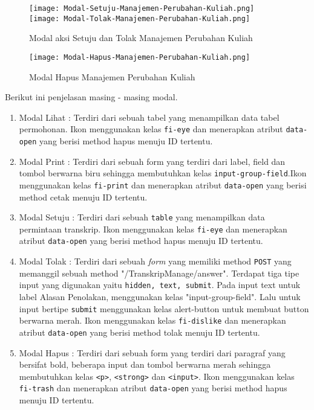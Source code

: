 \begin{figure} [H]
	\centering  
	\texttt{[image: Modal-Setuju-Manajemen-Perubahan-Kuliah.png]}
	\texttt{[image: Modal-Tolak-Manajemen-Perubahan-Kuliah.png]}    
	\caption{Modal aksi Setuju dan Tolak Manajemen Perubahan Kuliah} 
\end{figure}


\begin{figure} [H]
	\centering  
	\texttt{[image: Modal-Hapus-Manajemen-Perubahan-Kuliah.png]}  
	\caption{Modal Hapus Manajemen Perubahan Kuliah} 
\end{figure}

Berikut ini penjelasan masing - masing modal.
\begin{enumerate}
	
	\item Modal Lihat : Terdiri dari sebuah tabel yang menampilkan data tabel permohonan. Ikon menggunakan kelas  \colorbox{mygray}{\texttt{fi-eye}} dan menerapkan atribut  \colorbox{mygray}{\texttt{data-open}} yang berisi method hapus menuju ID tertentu.
	
	\item Modal Print : Terdiri dari sebuah form yang terdiri dari label, field dan tombol berwarna biru sehingga membutuhkan kelas  \colorbox{mygray}{\verb|input-group-field|}.Ikon menggunakan kelas  \colorbox{mygray}{\texttt{fi-print}} dan menerapkan atribut \texttt{data-open} yang berisi method cetak menuju ID tertentu.
	
	\item Modal Setuju : Terdiri dari sebuah \texttt{table} yang menampilkan data permintaan transkrip. Ikon menggunakan kelas  \colorbox{mygray}{\texttt{fi-eye}} dan menerapkan atribut  \colorbox{mygray}{\texttt{data-open}} yang berisi method hapus menuju ID tertentu.
	
	\item Modal Tolak : Terdiri dari sebuah \textit{form} yang memiliki method \texttt{POST} yang memanggil sebuah method "/TranskripManage/answer". Terdapat tiga tipe input yang digunakan yaitu  \colorbox{mygray}{\texttt{hidden, text, submit}}. Pada input text untuk label Alasan Penolakan, menggunakan kelas "input-group-field". Lalu untuk input bertipe  \colorbox{mygray}{\texttt{submit}} menggunakan kelas alert-button untuk membuat button berwarna merah. Ikon menggunakan kelas \texttt{fi-dislike} dan menerapkan atribut  \colorbox{mygray}{\texttt{data-open}} yang berisi method tolak menuju ID tertentu.	
	
	\item Modal Hapus : Terdiri dari sebuah form yang terdiri dari paragraf yang bersifat bold, beberapa input dan tombol berwarna merah sehingga membutuhkan kelas \colorbox{mygray}{\texttt{<p>}}, \colorbox{mygray}{\texttt{<strong>}} dan \colorbox{mygray}{\texttt{<input>}}. Ikon menggunakan kelas  \colorbox{mygray}{\texttt{fi-trash}} dan menerapkan atribut \colorbox{mygray}{\texttt{data-open}} yang berisi method hapus menuju ID tertentu.
\end{enumerate}

